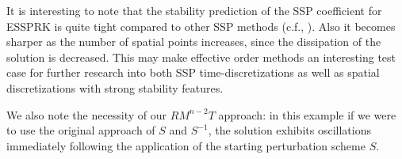 It is interesting to note that the stability prediction of the SSP
coefficient for ESSPRK is quite tight compared to other SSP methods
(c.f., \cite[Table 5.1]{Ketcheson/Gottlieb/Macdonald:TSRK}).
Also it becomes sharper as the number of spatial points increases,
since the dissipation of the solution is decreased. 
This may make effective order methods an interesting test case for
further research into both SSP time-discretizations as well as spatial
discretizations with strong stability features.

We also note the necessity of our $RM^{n-2}T$ approach: in this
example if we were to use the original approach of $S$ and $S^{-1}$,
the solution exhibits oscillations immediately following the
application of the starting perturbation scheme $S$.


